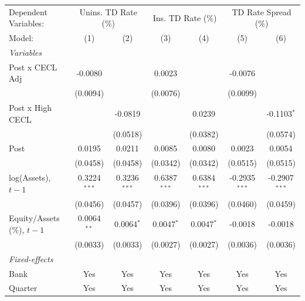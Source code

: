 
\begingroup
\centering
\begin{tabular}{lcccccc}
   \tabularnewline \midrule \midrule
   Dependent Variables: & \multicolumn{2}{c}{Unins. TD Rate (\%)} & \multicolumn{2}{c}{Ins. TD Rate (\%)} & \multicolumn{2}{c}{TD Rate Spread (\%)}\\
   Model:                       & (1)            & (2)            & (3)            & (4)            & (5)             & (6)\\  
   \midrule
   \emph{Variables}\\
   Post x CECL Adj              & -0.0080        &                & 0.0023         &                & -0.0076         &   \\   
                                & (0.0094)       &                & (0.0076)       &                & (0.0099)        &   \\   
   Post x High CECL             &                & -0.0819        &                & 0.0239         &                 & -0.1103$^{*}$\\   
                                &                & (0.0518)       &                & (0.0382)       &                 & (0.0574)\\   
   Post                         & 0.0195         & 0.0211         & 0.0085         & 0.0080         & 0.0023          & 0.0054\\   
                                & (0.0458)       & (0.0458)       & (0.0342)       & (0.0342)       & (0.0515)        & (0.0515)\\   
   log(Assets), $t{-}1$         & 0.3224$^{***}$ & 0.3236$^{***}$ & 0.6387$^{***}$ & 0.6384$^{***}$ & -0.2935$^{***}$ & -0.2907$^{***}$\\   
                                & (0.0456)       & (0.0457)       & (0.0396)       & (0.0396)       & (0.0460)        & (0.0459)\\   
   Equity/Assets (\%), $t{-}1$  & 0.0064$^{**}$  & 0.0064$^{*}$   & 0.0047$^{*}$   & 0.0047$^{*}$   & -0.0018         & -0.0018\\   
                                & (0.0033)       & (0.0033)       & (0.0027)       & (0.0027)       & (0.0036)        & (0.0036)\\   
   \midrule
   \emph{Fixed-effects}\\
   Bank                         & Yes            & Yes            & Yes            & Yes            & Yes             & Yes\\  
   Quarter                      & Yes            & Yes            & Yes            & Yes            & Yes             & Yes\\  

\end{tabular}
